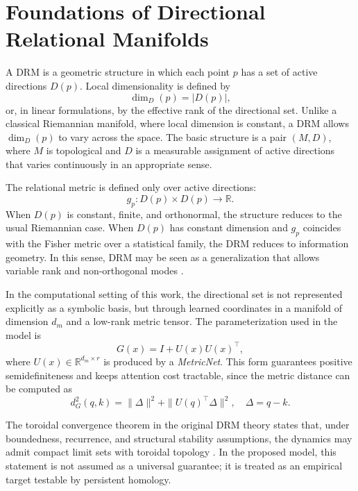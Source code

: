 \section{Foundations of Directional Relational Manifolds}
\label{sec:drm_foundations}

A DRM is a geometric structure in which each point $p$ has a set of active
directions $D(p)$. Local dimensionality is defined by
\begin{equation}
  \dim_D(p) = |D(p)|,
\end{equation}
or, in linear formulations, by the effective rank of the directional set.
Unlike a classical Riemannian manifold, where local dimension is constant, a DRM
allows $\dim_D(p)$ to vary across the space. The basic structure is a pair
$(M,D)$, where $M$ is topological and $D$ is a measurable assignment of active
directions that varies continuously in an appropriate sense.

The relational metric is defined only over active directions:
\begin{equation}
  g_p: D(p) \times D(p) \rightarrow \mathbb{R}.
\end{equation}
When $D(p)$ is constant, finite, and orthonormal, the structure reduces to the
usual Riemannian case. When $D(p)$ has constant dimension and $g_p$ coincides
with the Fisher metric over a statistical family, the DRM reduces to
information geometry. In this sense, DRM may be seen as a generalization that
allows variable rank and non-orthogonal modes \cite{amari_information_geometry,
muniz_drm_v11}.

In the computational setting of this work, the directional set is not
represented explicitly as a symbolic basis, but through learned coordinates in
a manifold of dimension $d_m$ and a low-rank metric tensor. The parameterization
used in the model is
\begin{equation}
  G(x) = I + U(x) U(x)^\top,
\end{equation}
where $U(x) \in \mathbb{R}^{d_m \times r}$ is produced by a \emph{MetricNet}.
This form guarantees positive semidefiniteness and keeps attention cost
tractable, since the metric distance can be computed as
\begin{equation}
  d_G^2(q,k) = \|\Delta\|^2 + \|U(q)^\top \Delta\|^2,
  \quad \Delta = q-k.
\end{equation}

The toroidal convergence theorem in the original DRM theory states that, under
boundedness, recurrence, and structural stability assumptions, the dynamics may
admit compact limit sets with toroidal topology \cite{muniz_drm_v11}. In the
proposed model, this statement is not assumed as a universal guarantee; it is
treated as an empirical target testable by persistent homology.
